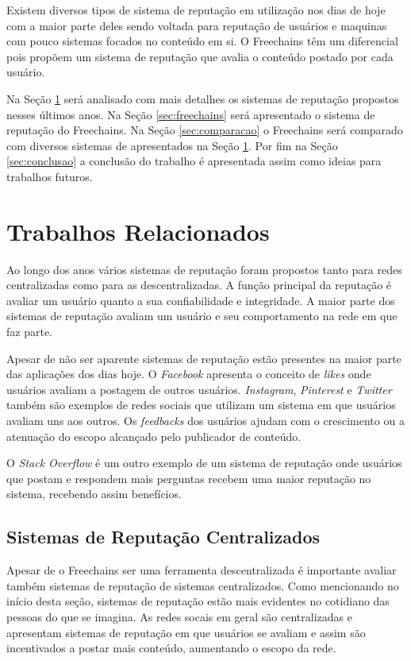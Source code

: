 \documentclass[12pt]{article}
\newcommand{\FC} {Freechains\xspace}
\begin{document}
Existem diversos tipos de sistema de reputação em utilização nos dias de hoje com a maior parte deles sendo voltada para reputação de usuários e maquinas com pouco sistemas focados no conteúdo em si. O \FC têm um diferencial pois propõem um sistema de reputação que avalia o conteúdo postado por cada usuário. 

Na Seção \ref{sec:trabrec} será analisado com mais detalhes os sistemas de reputação propostos nesses últimos anos. Na Seção \ref{sec:freechains} será apresentado o sistema de reputação do \FC. Na Seção \ref{sec:comparacao} o \FC será comparado com diversos sistemas de apresentados na Seção \ref{sec:trabrec}. Por fim na Seção \ref{sec:conclusao} a conclusão do trabalho é apresentada assim como ideias para trabalhos futuros.

\section{Trabalhos Relacionados} \label{sec:trabrec}

Ao longo dos anos vários sistemas de reputação foram propostos tanto para redes centralizadas como para as descentralizadas. A função principal da reputação é avaliar um usuário quanto a sua confiabilidade e integridade. A maior parte dos sistemas de reputação avaliam um usuário e seu comportamento na rede em que faz parte. 

Apesar de não ser aparente sistemas de reputação estão presentes na maior parte das aplicações dos dias hoje. O \emph{Facebook} apresenta o conceito de \emph{likes} onde usuários avaliam a postagem de outros usuários. \emph{Instagram}, \emph{Pinterest} e \emph{Twitter} também são exemplos de redes sociais que utilizam um sistema em que usuários avaliam uns aos outros. Os \emph{feedbacks} dos usuários ajudam com o crescimento ou a atenuação do escopo alcançado pelo publicador de conteúdo.  

O \emph{Stack Overflow} é um outro exemplo de um sistema de reputação onde usuários que postam e respondem mais perguntas recebem uma maior reputação no sistema, recebendo assim benefícios.

\subsection{Sistemas de Reputação Centralizados} \label{subsec:SRCentra}

Apesar de o \FC ser uma ferramenta descentralizada é importante avaliar também sistemas de reputação de sistemas centralizados. Como mencionando no início desta seção, sistemas de reputação estão mais evidentes no cotidiano das pessoas do que se imagina. As redes socais em geral são centralizadas e apresentam sistemas de reputação em que usuários se avaliam e assim são incentivados a postar mais conteúdo, aumentando o escopo da rede.
\end{document}
